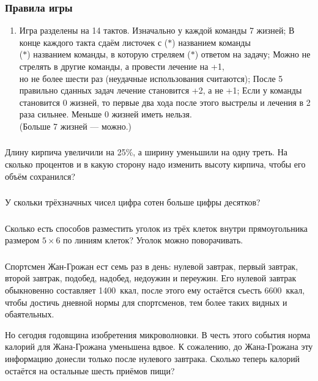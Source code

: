 \documentclass[aspectratio=1610,12pt,notheorems]{beamer}
\newcounter{zadacha}
\newcommand\slprob{
	\frametitle{\thezadacha} \stepcounter{zadacha}
}
\begin{document}
\begin{frame} \frametitle{Правила игры}
\begin{enumerate}
	\item Игра разделены на 14 тактов. Изначально у каждой команды 7 жизней;
	\mitem В конце каждого такта сдаём листочек с ($*$) названием команды\\ ($*$) названием команды, в которую стреляем ($*$) ответом на задачу;
	\mitem Можно не стрелять в другие команды, а провести лечение на +1,\\ но не более шести раз (неудачные использования считаются);
	\mitem После 5 правильно сданных задач лечение становится +2, а не +1;
	\mitem Если у команды становится 0 жизней, то первые два хода после этого выстрелы и лечения в 2 раза сильнее. Меньше 0 жизней иметь нельзя. \\
	(Больше 7 жизней — можно.)
\end{enumerate}
\end{frame}

\begin{frame} \slprob
	Длину кирпича увеличили на 25\%, а ширину уменьшили на одну треть. На сколько процентов и в какую сторону надо изменить высоту кирпича, чтобы его объём сохранился? 
\end{frame}

\begin{frame} \slprob
	У скольки трёхзначных чисел цифра сотен больше цифры десятков? 
\end{frame}

\begin{frame} \slprob
	Сколько есть способов разместить уголок из трёх клеток внутри прямоугольника размером $5 \times 6$ по линиям клеток? Уголок можно поворачивать.
\end{frame}

\begin{frame} \slprob
	Спортсмен Жан-Грожан ест семь раз в день: нулевой завтрак, первый завтрак, второй завтрак, подобед, надобед, недоужин и переужин. Его нулевой завтрак обыкновенно составляет 1400~ккал, после этого ему остаётся съесть 6600~ккал, чтобы достичь дневной нормы для спортсменов, тем более таких видных и обаятельных.

	Но сегодня годовщина изобретения микроволновки. В честь этого события норма калорий для Жана-Грожана уменьшена вдвое. К сожалению, до Жана-Грожана эту информацию донесли только после нулевого завтрака. Сколько теперь калорий остаётся на остальные шесть приёмов пищи?
\end{frame}
\end{document}
